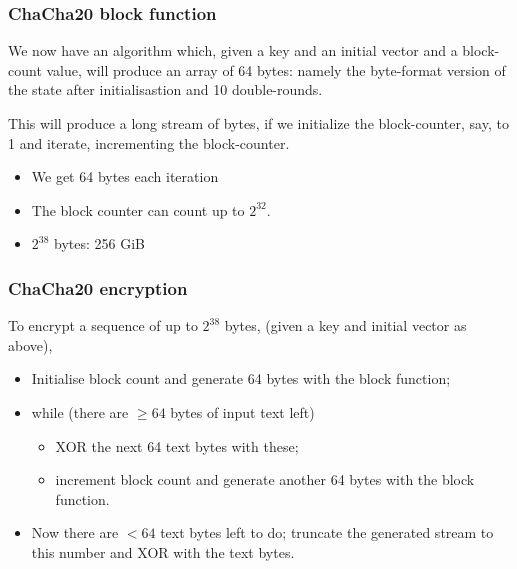 \documentclass[10pt, hyperref={pdfpagelabels=false}]{beamer}
\begin{document}
\begin{frame}
\frametitle{ChaCha20 block function}
We now have an algorithm which, given a key and an initial vector and a block-count value, will produce an array of 64 bytes: namely the byte-format version of the state after initialisastion and 10 double-rounds.

This will produce a long stream of bytes, if we initialize the block-counter, say, to 1 and iterate, incrementing the block-counter.
\begin{itemize}
\item We get 64 bytes each iteration
\item The block counter can count up to $2^{32}$.
\item $2^{38}$ bytes: 256 GiB
\end{itemize}
\end{frame}

\begin{frame}
\frametitle{ChaCha20 encryption}
To encrypt a sequence of up to $2^{38}$ bytes, (given a key and initial vector as above),
\begin{itemize}
\item Initialise block count and generate 64 bytes with the block function;
\item while (there are $\ge 64$ bytes of input text left)
  \begin{itemize}
  \item XOR the next 64 text bytes with these;
  \item increment block count and generate another 64 bytes with the block function.
  \end{itemize}
\item Now there are  $< 64$ text bytes left to do; truncate the generated stream to this number and XOR with the text bytes.
\end{itemize}
\end{frame}
\end{document}
